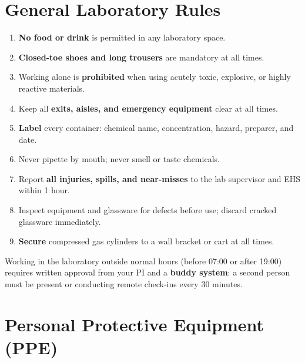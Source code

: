 \documentclass[11pt,a4paper]{article}
\begin{document}
\section{General Laboratory Rules}

\begin{enumerate}[noitemsep, topsep=2pt, leftmargin=1.6em, label=\textcolor{accent}{\bfseries\arabic*.}]
  \item \textbf{No food or drink} is permitted in any laboratory space.
  \item \textbf{Closed-toe shoes and long trousers} are mandatory at all times.
  \item Working alone is \textbf{prohibited} when using acutely toxic, explosive, or highly reactive materials.
  \item Keep all \textbf{exits, aisles, and emergency equipment} clear at all times.
  \item \textbf{Label} every container: chemical name, concentration, hazard, preparer, and date.
  \item Never pipette by mouth; never smell or taste chemicals.
  \item Report \textbf{all injuries, spills, and near-misses} to the lab supervisor and EHS within 1 hour.
  \item Inspect equipment and glassware for defects before use; discard cracked glassware immediately.
  \item \textbf{Secure} compressed gas cylinders to a wall bracket or cart at all times.
\end{enumerate}

\begin{warnbox}
  Working in the laboratory outside normal hours (before 07:00 or after 19:00) requires written
  approval from your PI and a \textbf{buddy system}: a second person must be present or conducting
  remote check-ins every 30 minutes.
\end{warnbox}

\section{Personal Protective Equipment (PPE)}
\end{document}
